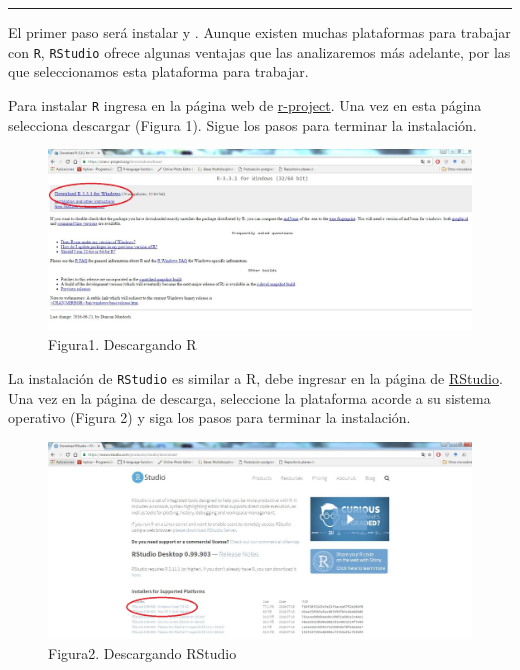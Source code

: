 \documentclass[
]{article}
\begin{document}
\begin{center}\rule{0.5\linewidth}{0.5pt}\end{center}

El primer paso será instalar y . Aunque existen muchas plataformas para
trabajar con \texttt{R}, \texttt{RStudio} ofrece algunas ventajas que
las analizaremos más adelante, por las que seleccionamos esta plataforma
para trabajar.

Para instalar \texttt{R} ingresa en la página web de
\href{https://cran.r-project.org/bin/windows/base/}{r-project}. Una vez
en esta página selecciona descargar (Figura 1). Sigue los pasos para
terminar la instalación.

\begin{figure}
\centering
\includegraphics{imagen/descargarR.jpg}
\caption{Figura1. Descargando R}
\end{figure}

La instalación de \texttt{RStudio} es similar a R, debe ingresar en la
página de
\href{https://www.rstudio.com/products/rstudio/download/}{RStudio}. Una
vez en la página de descarga, seleccione la plataforma acorde a su
sistema operativo (Figura 2) y siga los pasos para terminar la
instalación.

\begin{figure}
\centering
\includegraphics{imagen/descargarRStudio.jpg}
\caption{Figura2. Descargando RStudio}
\end{figure}
\end{document}
